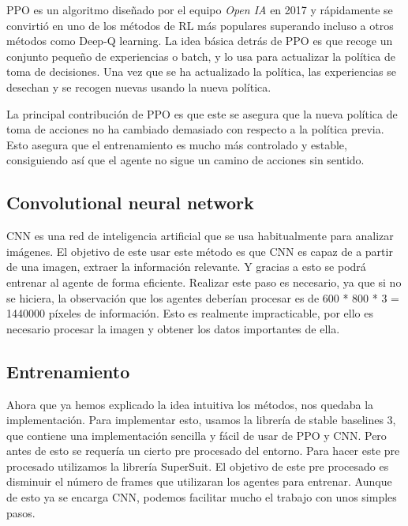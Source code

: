 PPO es un algoritmo diseñado por el equipo \textit{Open IA} en 2017 y rápidamente se convirtió en uno de los métodos de RL más populares superando incluso a otros métodos como Deep-Q learning. La idea básica detrás de PPO es que recoge un conjunto pequeño de experiencias o batch, y lo usa para actualizar la política de toma de decisiones. Una vez que se ha actualizado la política, las experiencias se desechan y se recogen nuevas usando la nueva política.

La principal contribución de PPO es que este se asegura que la nueva política de toma de acciones no ha cambiado demasiado con respecto a la política previa. Esto asegura que el entrenamiento es mucho más controlado y estable, consiguiendo así que el agente no sigue un camino de acciones sin sentido.

\subsection*{Convolutional neural network}

CNN es una red de inteligencia artificial que se usa habitualmente para analizar imágenes. El objetivo de este usar este método es que CNN es capaz de a partir de una imagen, extraer la información relevante. Y gracias a esto se podrá entrenar al agente de forma eficiente. Realizar este paso es necesario, ya que si no se hiciera, la observación que los agentes deberían procesar es de 600 * 800 * 3 = 1440000 píxeles de información. Esto es realmente impracticable, por ello es necesario procesar la imagen y obtener los datos importantes de ella.

\subsection*{Entrenamiento}

Ahora que ya hemos explicado la idea intuitiva los métodos, nos quedaba la implementación. Para implementar esto, usamos la librería de stable baselines 3, que contiene una implementación sencilla y fácil de usar de PPO y CNN. Pero antes de esto se requería un cierto pre procesado del entorno. Para hacer este pre procesado utilizamos la librería SuperSuit. El objetivo de este pre procesado es disminuir el número de frames que utilizaran los agentes para entrenar. Aunque de esto ya se encarga CNN, podemos facilitar mucho el trabajo con unos simples pasos. 

